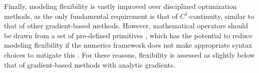 Finally, modeling flexibility is vastly improved over disciplined optimization methods, as the only fundamental requirement is that of $C^1$-continuity, similar to that of other gradient-based methods. However, mathematical operators should be drawn from a set of pre-defined primitives \cite{ rackauckas_generalizing_2021}, which has the potential to reduce modeling flexibility if the numerics framework does not make appropriate syntax choices to mitigate this \cite{jax}. For these reasons, flexibility is assessed as slightly below that of gradient-based methods with analytic gradients.
